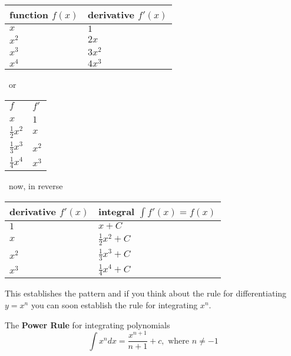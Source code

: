 \begin{center}
\begin{tabular}[c]{p{1.5cm}p{1.5cm}}\toprule
function $f(x)$  & derivative $f'(x)$  \\
\midrule
$x$  & $1$  \\
$x^{2}$  & $2 x$  \\
$x^{3}$  & $3 x^{2}$  \\
$x^{4}$  & $4 x^{3}$  \\
\bottomrule
\end{tabular}\ or
\
\begin{tabular}[c]{ll}\toprule
 $f$  & $f'$  \\
 &\\
\midrule
$x$  & $1$  \\
$\frac{1}{2} x^{2}$  & $x$  \\
$\frac{1}{3} x^{3}$  & $x^{2}$  \\
$\frac{1}{4} x^{4}$  & $x^{3}$  \\
\bottomrule
\end{tabular}\ now, in reverse \
\begin{tabular}[c]{p{2cm}p{2.5cm}}\toprule
derivative $f'(x)$  &  integral $\int f'(x)=f(x)$  \\\midrule
$1$  & $x +C$  \\
$x$  & $\frac{1}{2} x^{2} +C$  \\
$x^{2}$  & $\frac{1}{3} x^{3} +C$  \\
$x^{3}$  & $\frac{1}{4} x^{4} +C$  \\
\bottomrule
\end{tabular}
\end{center}
\bigskip This establishes the pattern and if you think about the rule for differentiating $y =x^{n}$ you can soon establish the rule for integrating $x^{n}$.
\begin{tcolorbox}
	The \textbf{Power Rule} for integrating polynomials
\[\int x^n dx = \frac{x^{n +1}}{n +1} +c, \text{ where }n \neq  -1
\]
\end{tcolorbox}


